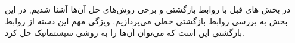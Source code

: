 در بخش های قبل با روابط بازگشتی و برخی روش‌های حل آن‌ها آشنا شدیم, در این بخش به بررسی روابط بازگشتی خطی می‌پردازیم,
ویژگی مهم این دسته از روابط بازگشتی این است 
که می‌توان آن‌ها را به روشی سیستماتیک حل کرد.


